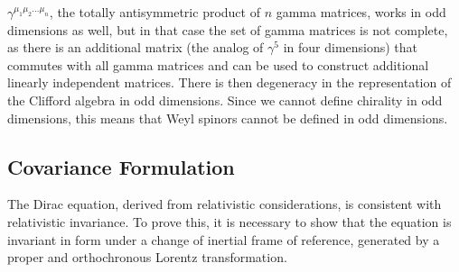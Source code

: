 \begin{remark}
    \(\gamma^{\mu_1 \mu_2 \dots \mu_n}\), the totally antisymmetric product of \(n\) gamma matrices, works in odd dimensions as well, but in that case the set of gamma matrices is not complete, as there is an additional matrix (the analog of \(\gamma^5\) in four dimensions) that commutes with all gamma matrices and can be used to construct additional linearly independent matrices. There is then degeneracy in the representation of the Clifford algebra in odd dimensions. Since we cannot define chirality in odd dimensions, this means that Weyl spinors cannot be defined in odd dimensions.
\end{remark}

\subsection{Covariance Formulation}

The Dirac equation, derived from relativistic considerations, is consistent with relativistic invariance. To prove this, it is necessary to show that the equation is invariant in form under a change of inertial frame of reference, generated by a proper and orthochronous Lorentz transformation.

